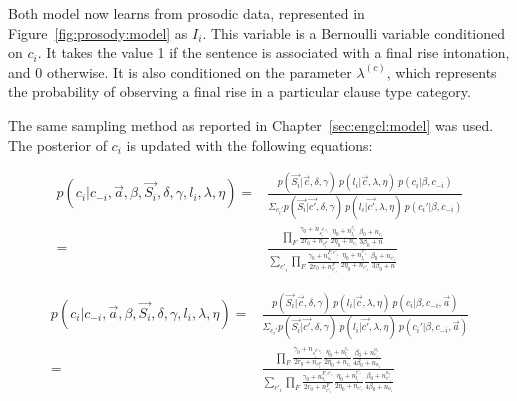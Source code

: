 Both model now learns from prosodic data, represented in Figure~\ref{fig:prosody:model} as $I_{i}$. This variable is a Bernoulli variable conditioned on $c_{i}$. It takes the value 1 if the sentence is associated with a final rise intonation, and 0 otherwise. It is also conditioned on the parameter $\lambda^{(c)}$, which represents the probability of observing a final rise in a particular clause type category. 

The same sampling method as reported in Chapter~\ref{sec:engcl:model} was used. The posterior of $c_{i}$ is updated with the following equations:


\begin{equation}\label{CfromSI}
\begin{split}
p(c_{i}| c_{-i}, \vec{a}, \beta, \vec{S_{i}}, \delta, \gamma, l_{i}, \lambda, \eta) = &
\frac{p(\vec{S_{i}}| \vec{c}, \delta, \gamma)\ p(l_{i} |\vec{c},\lambda, \eta)\ p(c_{i}|\beta, c_{-i})}{\Sigma_{c_{i}'}p(\vec{S_{i}}| \vec{c'}, \delta, \gamma)\ p(l_{i} |\vec{c'},\lambda, \eta)\ p(c_{i}'|\beta, c_{-i})}\\
=& \frac{ \prod_{F}\frac{\gamma_{0}+n_{s^{F, c_{i}}_{i}}}{2r_{0}+n_{c^{F}_{i}}}%
\frac{\eta_{0}+n_{l_{i}}^{c_{i}}}{2\eta_{0}+n_{c_{i}}}%
\frac{\beta_{0}+n_{c_{i}}}{3\beta_{0}+n}%
}%
{\sum_{c'_{i}}\prod_{F}\frac{\gamma_{0}+n^{F, c'_{i}}_{s_{i}}}{2r_{0}+n^{F}_{c'_{i}}}%
\frac{\eta_{0}+n_{l_{i}}^{c'_{i}}}{2\eta_{0}+n_{c'_{i}}}%
\frac{\beta_{0}+n_{c'_{i}}}{3\beta_{0}+n} %
}%
\end{split}
\end{equation}

\begin{equation}\label{CfromSIA}
\begin{split}
p(c_{i}| c_{-i}, \vec{a}, \beta, \vec{S_{i}}, \delta, \gamma, l_{i}, \lambda, \eta) = &
\frac{p(\vec{S_{i}}| \vec{c}, \delta, \gamma)\ p(l_{i} |\vec{c},\lambda, \eta)\ p(c_{i}|\beta, c_{-i}, \vec{a})}{\Sigma_{c_{i}'}p(\vec{S_{i}}| \vec{c'}, \delta, \gamma)\ p(l_{i} |\vec{c'},\lambda, \eta)\ p(c_{i}'|\beta, c_{-i}, \vec{a})}\\
=& \frac{ \prod_{F}\frac{\gamma_{0}+n_{s^{F, c_{i}}_{i}}}{2r_{0}+n_{c^{F}_{i}}}%
\frac{\eta_{0}+n_{l_{i}}^{c_{i}}}{2\eta_{0}+n_{c_{i}}}%
\frac{\beta_{0}+n_{c_{i}}^{a_{i}}}{4\beta_{0}+n_{a_{i}}}%
}%
{\sum_{c'_{i}}\prod_{F}\frac{\gamma_{0}+n^{F, c'_{i}}_{s_{i}}}{2r_{0}+n^{F}_{c'_{i}}}%
\frac{\eta_{0}+n_{l_{i}}^{c'_{i}}}{2\eta_{0}+n_{c'_{i}}}%
\frac{\beta_{0}+n_{c'_{i}}^{a_{i}}}{4\beta_{0}+n_{a_{i}}} %
}%
\end{split}
\end{equation}

